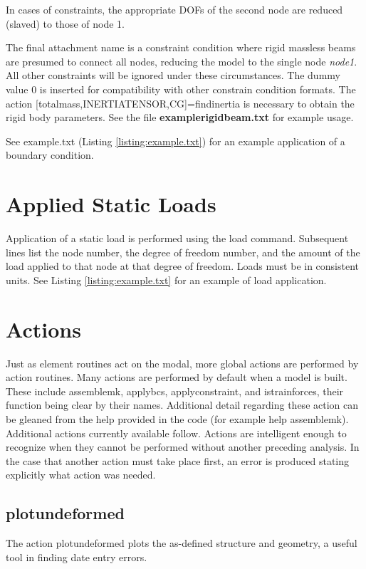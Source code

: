 \documentclass[12pt]{article}
\newcommand*{\command}[1]{\textsf{#1}}
\newcommand*{\variable}[1]{\textit{#1}}
\newcommand*{\filename}[1]{\textsf{\textbf{#1}}}
\begin{document}
In cases of constraints, the appropriate DOFs of the second node are reduced (slaved) to those of node 1. 

The final attachment name is a constraint condition where rigid massless beams are presumed to connect all nodes, reducing the model to the single node \variable{node1}. All other constraints will be ignored under these circumstances. The dummy value $0$ is inserted for compatibility with other constrain condition formats. The action \command{[totalmass,INERTIATENSOR,CG]=findinertia} is necessary to obtain the rigid body parameters. See the file \filename{examplerigidbeam.txt} for example usage. 


See example.txt (Listing \ref{listing:example.txt}) for an example
application of a boundary condition.

\section{Applied Static Loads}\label{staticloads}
Application of a static load is performed using the \command{load}
command. Subsequent lines list the node number, the degree of freedom
number, and the amount of the load applied to that node at that degree
of freedom. Loads must be in consistent units.  See Listing
\ref{listing:example.txt} for an example of load application.
\section{Actions}\label{sec:actions}
Just as element routines act on the modal, more global actions are performed by action routines. Many actions are performed by default when a model is built. These include \command{assemblemk}, \command{applybcs}, \command{applyconstraint}, and \command{istrainforces}, their function being clear by their names. Additional detail regarding these action can be gleaned from the help provided in the code (for example \command{help assemblemk}). Additional actions currently available follow. Actions are intelligent enough to recognize when they cannot be performed without another preceding analysis. In the case that another action must take place first, an error is produced stating explicitly what action was needed. 
\subsection{plotundeformed}
The action \command{plotundeformed} plots the as-defined structure and geometry, a useful tool in finding date entry errors. 
\end{document}
